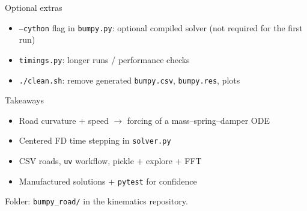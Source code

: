 \begin{frame}{Optional extras}
  \begin{itemize}
    \item \texttt{--cython} flag in \texttt{bumpy.py}: optional
          compiled solver (not required for the first run)
    \item \texttt{timings.py}: longer runs / performance checks
    \item \texttt{./clean.sh}: remove generated
          \texttt{bumpy.csv}, \texttt{bumpy.res}, plots
  \end{itemize}
\end{frame}

\begin{frame}{Takeaways}
  \begin{itemize}
    \item Road curvature + speed $\to$ forcing of a
          mass--spring--damper ODE
    \item Centered FD time stepping in \texttt{solver.py}
    \item CSV roads, \texttt{uv} workflow, pickle + explore + FFT
    \item Manufactured solutions + \texttt{pytest} for confidence
  \end{itemize}
  \vspace{0.8em}
  Folder: \texttt{bumpy\_road/} in the kinematics repository.
\end{frame}

